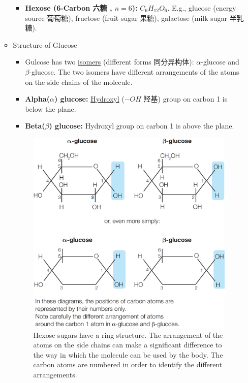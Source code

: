 \begin{itemize}
\begin{itemize}
\begin{itemize}
            \item \textbf{Hexose (6-Carbon 六糖 , $n=6$):} $C_6H_{12}O_6$. E.g., glucose (energy source 葡萄糖), fructose (fruit
            sugar 果糖), galactose (milk sugar 半乳糖).
        \end{itemize}
        \item Structure of Glucose
        \begin{itemize}
            \item Gulcose has two \underline{isomers} (different forms 同分异构体): $\alpha$-glucose and $\beta$-glucose. The two
            isomers have different arrangements of the atoms on the side chains of the molecule.
            \item \textbf{Alpha($\alpha$) glucose:} \underline{Hydroxyl} ($-OH$ 羟基) group on carbon 1 is below the plane.
            \item \textbf{Beta($\beta$) glucose:} Hydroxyl group on carbon 1 is above the plane.
        \end{itemize}
        \begin{figure}[H]
            \centering
            \includegraphics[scale=0.155]{Biology/1A/Images/1A-2-3.png}
            \caption{Hexose sugars have a ring structure. The arrangement of the atoms on the side chains can make a significant
            difference to the way in which the molecule can be used by the body. The carbon atoms are numbered in order to
            identify the different arrangements.}
        \end{figure}
    \end{itemize}
\end{itemize}

